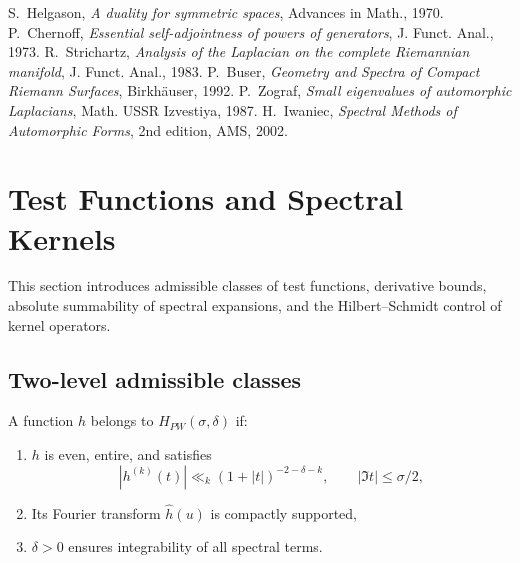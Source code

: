 \begin{thebibliography}{9}
 S.~Helgason, \emph{A duality for symmetric spaces}, Advances in Math., 1970.
 P.~Chernoff, \emph{Essential self-adjointness of powers of generators}, J. Funct. Anal., 1973.
 R.~Strichartz, \emph{Analysis of the Laplacian on the complete Riemannian manifold}, J. Funct. Anal., 1983.
 P.~Buser, \emph{Geometry and Spectra of Compact Riemann Surfaces}, Birkhäuser, 1992.
 P.~Zograf, \emph{Small eigenvalues of automorphic Laplacians}, Math. USSR Izvestiya, 1987.
 H.~Iwaniec, \emph{Spectral Methods of Automorphic Forms}, 2nd edition, AMS, 2002.
\end{thebibliography}

\section{Test Functions and Spectral Kernels}
\label{sec:test-funcs}

This section introduces admissible classes of test functions, 
derivative bounds, absolute summability of spectral expansions, 
and the Hilbert–Schmidt control of kernel operators.

\subsection{Two-level admissible classes}

\begin{definition}
\label{def:PW2}
A function $h$ belongs to $H_{PW}(\sigma,\delta)$ if:
\begin{enumerate}
\item $h$ is even, entire, and satisfies
\[
|h^{(k)}(t)| \ll_k (1+|t|)^{-2-\delta-k}, \qquad |\Im t|\leq \sigma/2,
\]
\item Its Fourier transform $\widehat{h}(u)$ is compactly supported,
\item $\delta>0$ ensures integrability of all spectral terms.
\end{enumerate}
\end{definition}

